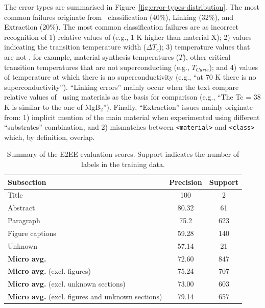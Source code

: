 The error types are summarised in Figure~\ref{fig:error-types-distribution}. The most common failures originate from \tc~classification (40\%), Linking (32\%), and Extraction (20\%).
The most common \tc classification failures are as incorrect recognition of 1) relative values of \tc (e.g., 1 K higher than material X); 2) values indicating the transition temperature width ($\Delta T_{c}$); 3) temperature values that are not \tc, for example, material synthesis temperatures ($T$), other critical transition temperatures that are not superconducting (e.g., $T_{Curie}$); and 4) values of temperature at which there is no superconductivity (e.g., ``at 70 K there is no superconductivity'').
``Linking errors'' mainly occur when the text compare relative values of \tc~using materials as the basis for comparison (e.g., ``The Tc = 38 K is similar to the one of MgB$_{2}$'').
Finally, ``Extraction'' issues mainly originate from: 1) implicit mention of the main material when experimented using different ``substrates'' combination, and 2) mismatches between \texttt{<material>} and \texttt{<class>} which, by definition, overlap.


\begin{table}[htbp]
    \centering
    \caption{Summary of the E2EE evaluation scores. Support indicates the number of labels in the training data.}
    \begin{tabular}{l c c}
        \toprule
        \textbf{Subsection}                                      & \textbf{Precision} & \textbf{Support} \\
        \midrule
        Title                                                    & 100                & 2                \\
        Abstract                                                 & 80.32              & 61               \\
        Paragraph                                                & 75.2               & 623              \\
        Figure captions                                          & 59.28              & 140              \\
        Unknown                                                  & 57.14              & 21               \\
        \midrule
        \textbf{Micro avg.}                                      & 72.60              & 847              \\
        \textbf{Micro avg.} (excl. figures)                      & 75.24              & 707              \\
        \textbf{Micro avg.} (excl. unknown sections)             & 73.00              & 603              \\
        \textbf{Micro avg.} (excl. figures and unknown sections) & 79.14              & 657              \\
        \bottomrule
    \end{tabular}
    
    \label{table:end2end-evaluation-summary}
\end{table}

